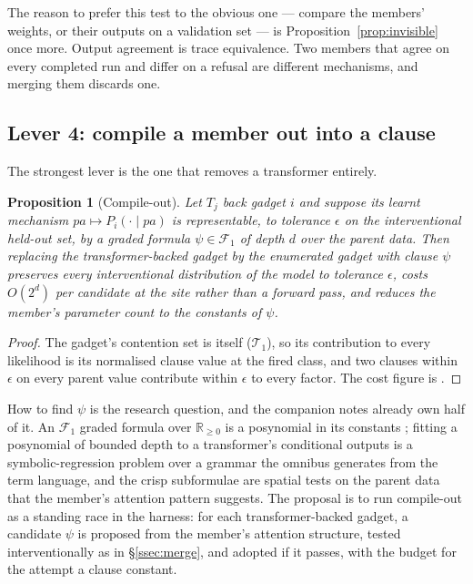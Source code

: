 \documentclass[11pt]{article}
\theoremstyle{plain}
\newtheorem{proposition}[theorem]{Proposition}
\theoremstyle{definition}
\theoremstyle{remark}
\newcommand{\Rnn}{\mathbb{R}_{\geq 0}}
\begin{document}
The reason to prefer this test to the obvious one --- compare the members'
weights, or their outputs on a validation set --- is Proposition~\ref{prop:invisible}
once more. Output agreement is trace equivalence. Two members that agree on
every completed run and differ on a refusal are different mechanisms, and
merging them discards one.

\subsection{Lever 4: compile a member out into a clause}

The strongest lever is the one that removes a transformer entirely.

\begin{proposition}[Compile-out]\label{prop:compileout}
Let $T_j$ back gadget $i$ and suppose its learnt mechanism
$\mathit{pa} \mapsto P_i(\cdot \mid \mathit{pa})$ is representable, to tolerance
$\epsilon$ on the interventional held-out set, by a graded formula
$\psi \in \mathcal{F}_1$ of depth $d$ over the parent data. Then replacing the
transformer-backed gadget by the enumerated gadget with clause $\psi$ preserves
every interventional distribution of the model to tolerance $\epsilon$, costs
$O(2^d)$ per candidate at the site rather than a forward pass, and reduces the
member's parameter count to the constants of $\psi$.
\end{proposition}

\begin{proof}
The gadget's contention set is itself ($\mathcal{T}_1$), so its contribution to
every likelihood is its normalised clause value at the fired class, and two
clauses within $\epsilon$ on every parent value contribute within $\epsilon$
to every factor. The cost figure is \cite[Def.~7.2]{Interventions}.
\end{proof}

How to find $\psi$ is the research question, and the companion notes already
own half of it. An $\mathcal{F}_1$ graded formula over $\Rnn$ is a posynomial in
its constants \cite[Prop.~5.2]{GradedPLN}; fitting a posynomial of bounded
depth to a transformer's conditional outputs is a symbolic-regression problem
over a grammar the omnibus \cite{Omnibus} generates from the term language, and
the crisp subformulae are spatial tests on the parent data that the member's
attention pattern suggests. The proposal is to run compile-out as a standing
race in the harness: for each transformer-backed gadget, a candidate $\psi$ is
proposed from the member's attention structure, tested interventionally as in
\S\ref{ssec:merge}, and adopted if it passes, with the budget for the attempt a
clause constant.
\end{document}
